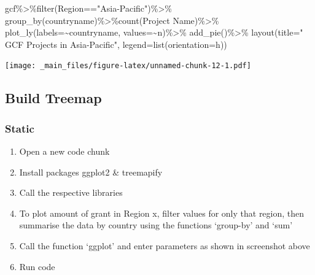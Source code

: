 \documentclass[
]{book}
\newenvironment{Shaded}{\begin{snugshade}}{\end{snugshade}}
\newcommand{\AttributeTok}[1]{\textcolor[rgb]{0.77,0.63,0.00}{#1}}
\newcommand{\FunctionTok}[1]{\textcolor[rgb]{0.00,0.00,0.00}{#1}}
\newcommand{\NormalTok}[1]{#1}
\newcommand{\SpecialCharTok}[1]{\textcolor[rgb]{0.00,0.00,0.00}{#1}}
\newcommand{\StringTok}[1]{\textcolor[rgb]{0.31,0.60,0.02}{#1}}
\providecommand{\tightlist}{%
  \setlength{\itemsep}{0pt}\setlength{\parskip}{0pt}}
\begin{document}
\begin{Shaded}
\begin{Highlighting}[]
\NormalTok{gcf}\SpecialCharTok{\%\textgreater{}\%}\FunctionTok{filter}\NormalTok{(Region}\SpecialCharTok{==}\StringTok{"Asia{-}Pacific"}\NormalTok{)}\SpecialCharTok{\%\textgreater{}\%}
  \FunctionTok{group\_by}\NormalTok{(countryname)}\SpecialCharTok{\%\textgreater{}\%}\FunctionTok{count}\NormalTok{(}\StringTok{\textasciigrave{}}\AttributeTok{Project Name}\StringTok{\textasciigrave{}}\NormalTok{)}\SpecialCharTok{\%\textgreater{}\%}
        \FunctionTok{plot\_ly}\NormalTok{(}\AttributeTok{labels=}\SpecialCharTok{\textasciitilde{}}\NormalTok{countryname, }\AttributeTok{values=}\SpecialCharTok{\textasciitilde{}}\NormalTok{n)}\SpecialCharTok{\%\textgreater{}\%}
    \FunctionTok{add\_pie}\NormalTok{()}\SpecialCharTok{\%\textgreater{}\%}
    \FunctionTok{layout}\NormalTok{(}\AttributeTok{title=}\StringTok{" GCF Projects in Asia{-}Pacific"}\NormalTok{,}
           \AttributeTok{legend=}\FunctionTok{list}\NormalTok{(}\AttributeTok{orientation=}\StringTok{\textquotesingle{}h\textquotesingle{}}\NormalTok{))}
\end{Highlighting}
\end{Shaded}

\texttt{[image: \_main\_files/figure-latex/unnamed-chunk-12-1.pdf]}

\hypertarget{build-treemap}{%
\subsection{Build Treemap}\label{build-treemap}}

\hypertarget{static}{%
\subsubsection{Static}\label{static}}

\begin{enumerate}
\def\labelenumi{\arabic{enumi}.}
\tightlist
\item
  Open a new code chunk
\item
  Install packages ggplot2 \& treemapify
\item
  Call the respective libraries
\item
  To plot amount of grant in Region x, filter values for only that region,
  then summarise the data by country using the functions `group-by' and `sum'
\item
  Call the function `ggplot' and enter parameters as shown in screenshot above
\item
  Run code
\end{enumerate}
\end{document}
